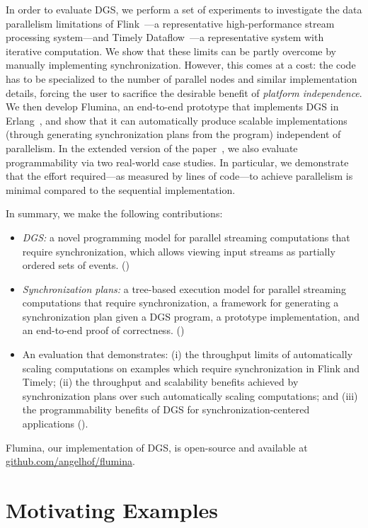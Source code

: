 In order to evaluate DGS, we perform a set of experiments to investigate the data parallelism limitations of Flink~\cite{carbone2015flink}---a representative high-performance stream processing system---and
Timely Dataflow~\cite{murray2013naiad}---a representative system with iterative computation.
We show that these limits can be partly overcome by manually implementing synchronization. However, this comes at a cost: the code has to be specialized
to the number of parallel nodes and similar implementation details, forcing
the user to sacrifice the desirable benefit of \emph{platform independence}.
We then develop Flumina, an end-to-end prototype that implements DGS in Erlang~\cite{armstrong1993erlang}, and show that it can automatically produce scalable implementations (through generating synchronization plans from the program) independent of parallelism.
In the extended version of the paper~\cite{flumina-arxiv},
we also evaluate programmability via two real-world case studies.
In particular,
we demonstrate that the effort required---as measured by lines of code---to achieve parallelism is minimal compared to the sequential implementation.

In summary, we make the following contributions:
\begin{itemize}
\item
\emph{DGS:} a novel programming model for parallel streaming computations that require synchronization, which allows viewing input streams as partially ordered sets of events. ()
\item
\emph{Synchronization plans:} a tree-based execution model for parallel streaming computations that require synchronization, a framework for generating a synchronization plan given a DGS program, a prototype implementation, and an end-to-end proof of correctness.
()
\item
An evaluation that demonstrates: (i) the throughput limits of automatically scaling computations on examples which require synchronization in Flink and Timely; (ii) the throughput and scalability benefits achieved by synchronization plans over such automatically scaling computations; and (iii) the programmability benefits of DGS for synchronization-centered applications
().
\end{itemize}
Flumina, our implementation of DGS, is open-source and available
at \href{https://github.com/angelhof/flumina}{github.com/angelhof/flumina}.

\section{Motivating Examples}
\label{dgs:ssec:motivating-application}


